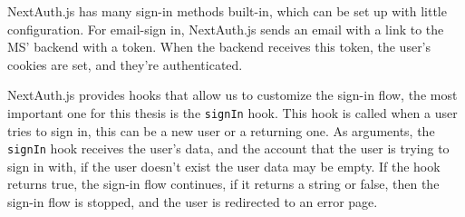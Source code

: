 NextAuth.js has many sign-in methods built-in, which can be set up with little configuration.
For email-sign in, NextAuth.js sends an email with a link to the MS' backend with a token. 
When the backend receives this token, the user's cookies are set, and they're authenticated.


NextAuth.js provides hooks that allow us to customize the sign-in flow, the most important
one for this thesis is the \lstinline{signIn} hook.
This hook is called when a user tries to sign in, this can be a new user or a returning
one.
As arguments, the \lstinline{signIn} hook receives the user's data,
and the account that the user is trying to sign in with,
if the user doesn't exist the user data may be empty.
If the hook returns true, the sign-in flow continues, if it returns a string or false,
then the sign-in flow is stopped, and the user is redirected to an error page.

%
%


%
%


